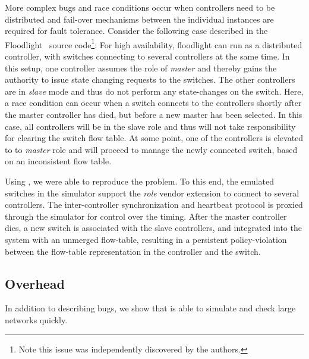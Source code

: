 
More complex bugs and race conditions occur when controllers need to be
distributed and fail-over mechanisms between the individual instances are
required for fault tolerance. Consider the following case described in the
Floodlight~\cite{floodlight} source code\footnote{Note this issue was
independently discovered by the authors.}: For high availability, floodlight can run as a
distributed controller, with switches connecting to several controllers at the
same time. In this setup, one controller assumes the role of \emph{master} and
thereby gains the authority to issue state changing requests to the switches.
The other controllers are in \emph{slave} mode and thus do not perform any
state-changes on the switch. Here, a race condition can occur when a switch
connects to the controllers shortly after the master controller has died, but
before a new master has been selected. In this case, all controllers will be in
the slave role and thus will not take responsibility for clearing the switch
flow table. At some point, one of the controllers is elevated to to
\emph{master} role and will proceed to manage the newly connected switch, based
on an inconsistent flow table.

Using \projectname, we were able to reproduce the problem. To this end, the
emulated switches in the simulator support the \emph{role} vendor extension to
connect to several controllers. The inter-controller synchronization and heartbeat
protocol is proxied through the simulator for control over the timing. After the
master controller dies, a new switch is associated with the slave controllers, and
integrated into the system with an unmerged flow-table, resulting in a persistent
policy-violation between the flow-table representation in the controller and the switch.

\subsection{Overhead}

In addition to describing bugs, we show that \projectname{} is able 
to simulate and check large networks quickly.

